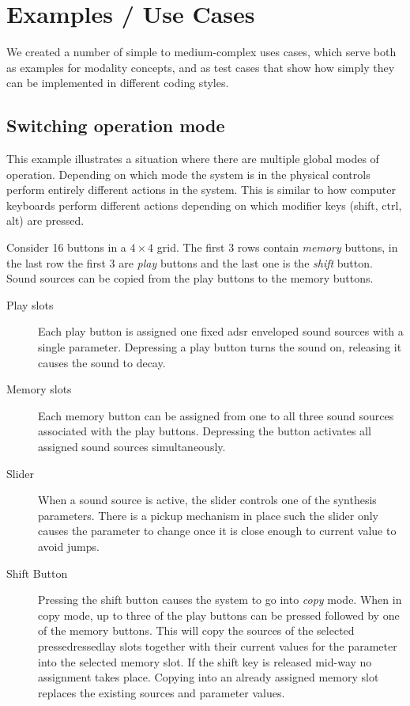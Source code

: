 \documentclass{article}
\begin{document}
\section{Examples / Use Cases}
\label{sec:examples_use_cases}

We created a number of simple to medium-complex uses cases, which serve both as examples for modality concepts, and as test cases that show how simply they can be implemented in different coding styles. 

\subsection{Switching operation mode}
\label{sub:mpd_18}

This example illustrates a situation where there are multiple global  modes of operation. Depending on which mode the system is in the physical controls perform entirely different actions in the system. This is similar to how computer keyboards perform different actions depending on which modifier keys (shift, ctrl, alt) are pressed.

Consider 16 buttons in a $4\times4$ grid. The first 3 rows contain \emph{memory} buttons, in the last row the first 3 are \emph{play} buttons and the last one is the \emph{shift} button.   Sound sources can be copied from the play buttons to the memory buttons.

\begin{description}
 \item [Play slots]  Each play button is assigned one fixed adsr enveloped sound sources with a single parameter. Depressing a play button turns the sound on, releasing it causes the sound to decay. 
 \item [Memory slots] Each memory button can be assigned from one to all three sound sources associated with the play buttons. Depressing the button activates all assigned sound sources simultaneously.
 \item [Slider] When a sound source is active, the slider controls one of the synthesis parameters. There is a pickup mechanism in place such  the slider only causes the parameter to change once it is close enough to current value to avoid jumps. 
 \item [Shift Button] Pressing the shift button causes the system to go into \emph{copy} mode. When in copy mode, up to three of the play buttons can be pressed followed by one of the memory buttons. This will copy the sources of the selected pressedressedlay slots together with their current values for the parameter into the selected memory slot. If the shift key is released mid-way no assignment takes place. Copying into an already assigned memory slot replaces the existing sources and parameter values.
\end{description}
\end{document}
